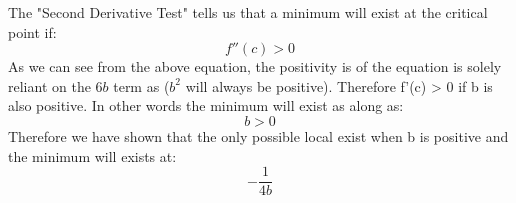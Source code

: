 \documentclass[11pt]{article}
\begin{document}
The "Second Derivative Test" tells us that a minimum will exist at the critical point if:
\[ f''(c) > 0 \]
As we can see from the above equation, the positivity is of the equation is solely reliant on the $6b$ term as ($b^2$ will always be positive). Therefore f'(c) > 0 if b is also positive. In other words the minimum will exist as along as:
\[ b > 0 \]
Therefore we have shown that the only possible local exist when b is positive and the minimum will exists at:
\[ -\frac{1}{4b} \]
\end{document}
